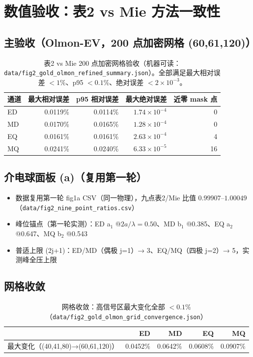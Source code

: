 \section{数值验收：表2 vs Mie 方法一致性}

\subsection{主验收（Olmon-EV，200 点加密网格 (60,61,120)）}

\begin{table}[H]
\centering
\begin{tabular}{lrrrr}
\toprule
通道 & 最大相对误差 & p95 相对误差 & 最大绝对误差 & 近零 mask 点 \\
\midrule
ED & 0.0119\% & 0.0114\% & $1.74\times10^{-4}$ & 0 \\
MD & 0.0170\% & 0.0165\% & $1.28\times10^{-4}$ & 0 \\
EQ & 0.0161\% & 0.0161\% & $2.63\times10^{-4}$ & 4 \\
MQ & 0.0241\% & 0.0240\% & $6.33\times10^{-5}$ & 16 \\
\bottomrule
\end{tabular}
\caption{表2 vs Mie 200 点加密网格验收（机器可读：\texttt{data/fig2\_gold\_olmon\_refined\_summary.json}）。全部满足最大相对误差 $<1\%$、p95 $<0.1\%$、绝对误差 $<2\times10^{-3}$。}
\end{table}

\subsection{介电球面板 (a)（复用第一轮）}

\begin{itemize}
  \item 数据复用第一轮 fig1a CSV（同一物理），九点表2/Mie 比值 $0.99907$--$1.00049$（\texttt{data/fig2\_nine\_point\_ratios.csv}）
  \item 峰位锚点（第一轮实测）：ED a$_1$ @$2a/\lambda=0.50$、MD b$_1$ @0.385、EQ a$_2$ @0.647、MQ b$_2$ @0.543
  \item 普适上限 (2j+1)：ED/MD（偶极 j=1）→ 3、EQ/MQ（四极 j=2）→ 5，实测峰全压上限
\end{itemize}

\subsection{网格收敛}

\begin{table}[H]
\centering
\begin{tabular}{lrrrr}
\toprule
 & ED & MD & EQ & MQ \\
\midrule
最大变化（(40,41,80)→(60,61,120)） & 0.0452\% & 0.0642\% & 0.0608\% & 0.0907\% \\
\bottomrule
\end{tabular}
\caption{网格收敛：高信号区最大变化全部 $<0.1\%$（\texttt{data/fig2\_gold\_olmon\_grid\_convergence.json}）}
\end{table}

